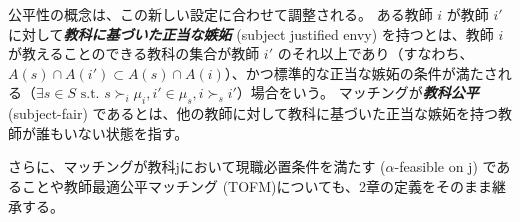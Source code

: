 \documentclass[12pt, a4paper]{article}
\theoremstyle{definition}
\theoremstyle{remark}
\theoremstyle{plain}
\begin{document}


公平性の概念は、この新しい設定に合わせて調整される。
ある教師 $i$ が教師 $i'$ に対して\textbf{\textit{教科に基づいた正当な嫉妬}} (subject justified envy) を持つとは、教師 $i$ が教えることのできる教科の集合が教師 $i'$ のそれ以上であり（すなわち、$A(s) \cap A(i') \subset A(s) \cap A(i)$）、かつ標準的な正当な嫉妬の条件が満たされる（$\exists s \in S \text{ s.t. } s \succ_i \mu_i, i' \in \mu_s, i \succ_s i'$）場合をいう。
マッチングが\textbf{\textit{教科公平}} (subject-fair) であるとは、他の教師に対して教科に基づいた正当な嫉妬を持つ教師が誰もいない状態を指す。

さらに、マッチングが教科jにおいて現職必置条件を満たす ($\alpha$-feasible on j) であることや教師最適公平マッチング (TOFM)についても、2章の定義をそのまま継承する。



\end{document}
